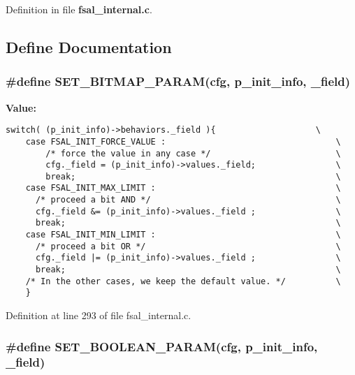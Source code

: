 Definition in file {\bf fsal\_\-internal.c}.

\subsection{Define Documentation}
\subsubsection[{SET\_\-BITMAP\_\-PARAM}]{\setlength{\rightskip}{0pt plus 5cm}\#define SET\_\-BITMAP\_\-PARAM(cfg, \/  p\_\-init\_\-info, \/  \_\-field)}\label{fsal__internal_8c_ba08a3bf394576d1a142b9f4b81867bf}


\textbf{Value:}

\begin{Code}\begin{verbatim}switch( (p_init_info)->behaviors._field ){                    \
    case FSAL_INIT_FORCE_VALUE :                                  \
        /* force the value in any case */                         \
        cfg._field = (p_init_info)->values._field;                \
        break;                                                    \
    case FSAL_INIT_MAX_LIMIT :                                    \
      /* proceed a bit AND */                                     \
      cfg._field &= (p_init_info)->values._field ;                \
      break;                                                      \
    case FSAL_INIT_MIN_LIMIT :                                    \
      /* proceed a bit OR */                                      \
      cfg._field |= (p_init_info)->values._field ;                \
      break;                                                      \
    /* In the other cases, we keep the default value. */          \
    }
\end{verbatim}
\end{Code}


Definition at line 293 of file fsal\_\-internal.c.
\subsubsection[{SET\_\-BOOLEAN\_\-PARAM}]{\setlength{\rightskip}{0pt plus 5cm}\#define SET\_\-BOOLEAN\_\-PARAM(cfg, \/  p\_\-init\_\-info, \/  \_\-field)}\label{fsal__internal_8c_2d4e102fe0da3b9340d2448907db42c6}


